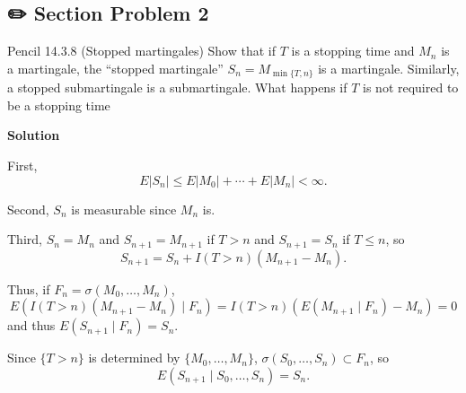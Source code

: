 \documentclass[
  letterpaper,
  DIV=11,
  numbers=noendperiod]{scrreprt}
\theoremstyle{definition}
\theoremstyle{plain}
\theoremstyle{remark}
\begin{document}
\hypertarget{section-problem-2-5}{%
\subsection*{✏️ Section Problem 2}\label{section-problem-2-5}}

Pencil 14.3.8 (Stopped martingales) Show that if \(T\) is a stopping
time and \(M_{n}\) is a martingale, the ``stopped martingale''
\(S_{n} =M_{\min \{T,n\}}\) is a martingale. Similarly, a stopped
submartingale is a submartingale. What happens if \(T\) is not required
to be a stopping time

\begin{tcolorbox}[enhanced jigsaw, bottomrule=.15mm, opacityback=0, arc=.35mm, breakable, left=2mm, colframe=quarto-callout-tip-color-frame, toprule=.15mm, rightrule=.15mm, leftrule=.75mm, colback=white]
\begin{minipage}[t]{5.5mm}
\textcolor{quarto-callout-tip-color}{\faLightbulb}
\end{minipage}%
\begin{minipage}[t]{\textwidth - 5.5mm}

\textbf{Solution}\vspace{2mm}

First, \[
\begin{equation*}
E|S_{n} |\leq E|M_{0} |+\cdots +E|M_{n} |< \infty .
\end{equation*}
\]

Second, \(\displaystyle S_{n}\) is measurable since
\(\displaystyle M_{n}\) is.

Third, \(\displaystyle S_{n} =M_{n}\) and
\(\displaystyle S_{n+1} =M_{n+1}\) if \(\displaystyle T >n\) and
\(\displaystyle S_{n+1} =S_{n}\) if \(\displaystyle T\leq n\), so \[
\begin{equation*}
S_{n+1} =S_{n} +I( T >n)( M_{n+1} -M_{n}) .
\end{equation*}
\]

Thus, if \(\displaystyle F_{n} =\sigma ( M_{0} ,\dotsc ,M_{n})\), \[
\begin{equation}
E( I( T >n)( M_{n+1} -M_{n}) \mid F_{n}) =I( T >n)( E( M_{n+1} \mid F_{n}) -M_{n}) =0
\end{equation}
\] and thus \(\displaystyle E( S_{n+1} \mid F_{n}) =S_{n}\).

Since \(\displaystyle \{T >n\}\) is determined by
\(\displaystyle \{M_{0} ,\dotsc ,M_{n}\}\),
\(\displaystyle \sigma ( S_{0} ,\dotsc ,S_{n}) \subset F_{n}\), so \[
\begin{equation*}
E( S_{n+1} \mid S_{0} ,\dotsc ,S_{n}) =S_{n} .
\end{equation*}
\]


\end{minipage}
\end{tcolorbox}
\end{document}
